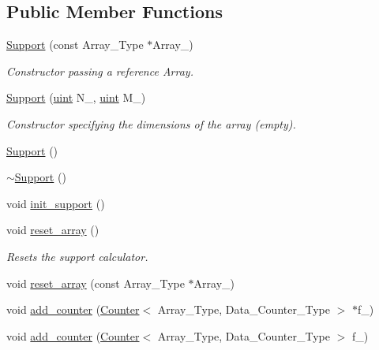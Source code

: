 \subsection*{Public Member Functions}
\begin{DoxyCompactItemize}
\item 
\hyperlink{classbarry_1_1_support_ab34144acc225be907c1403b06573b016}{Support} (const Array\+\_\+\+Type $\ast$Array\+\_\+)
\begin{DoxyCompactList}\small\item\em Constructor passing a reference Array. \end{DoxyCompactList}\item 
\hyperlink{classbarry_1_1_support_a0deea9b8e83fd418dfad59fb4cfb2ad5}{Support} (\hyperlink{namespacebarry_a11dfc53ddb4672278319aa04f1e09a6c}{uint} N\+\_\+, \hyperlink{namespacebarry_a11dfc53ddb4672278319aa04f1e09a6c}{uint} M\+\_\+)
\begin{DoxyCompactList}\small\item\em Constructor specifying the dimensions of the array (empty). \end{DoxyCompactList}\item 
\hyperlink{classbarry_1_1_support_a08a48546e91c5259a26be4cde31ef902}{Support} ()
\item 
\hyperlink{classbarry_1_1_support_a4ea99cc1691b04b76a333e851aab4b64}{$\sim$\+Support} ()
\item 
void \hyperlink{classbarry_1_1_support_ae1fb3da18406ade3adc254e408d5f87b}{init\+\_\+support} ()
\item 
void \hyperlink{classbarry_1_1_support_a4f2860fd2e8e30703b91633a92ed7a58}{reset\+\_\+array} ()
\begin{DoxyCompactList}\small\item\em Resets the support calculator. \end{DoxyCompactList}\item 
void \hyperlink{classbarry_1_1_support_a6e39b22dfd1e0a0ceebf596c974f5326}{reset\+\_\+array} (const Array\+\_\+\+Type $\ast$Array\+\_\+)
\item 
void \hyperlink{classbarry_1_1_support_a364df2c6295341f2801ebe0419d1d97c}{add\+\_\+counter} (\hyperlink{classbarry_1_1_counter}{Counter}$<$ Array\+\_\+\+Type, Data\+\_\+\+Counter\+\_\+\+Type $>$ $\ast$f\+\_\+)
\item 
void \hyperlink{classbarry_1_1_support_a00d511970c0bf833ef8bdd7580c670cc}{add\+\_\+counter} (\hyperlink{classbarry_1_1_counter}{Counter}$<$ Array\+\_\+\+Type, Data\+\_\+\+Counter\+\_\+\+Type $>$ f\+\_\+)

\end{DoxyCompactItemize}
